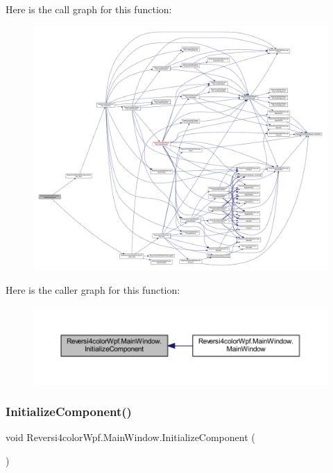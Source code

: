 Here is the call graph for this function\+:
\nopagebreak
\begin{figure}[H]
\begin{center}
\leavevmode
\includegraphics[width=350pt]{class_reversi4color_wpf_1_1_main_window_a20f84946e71f327820f3ccbefca1f3a0_cgraph}
\end{center}
\end{figure}
Here is the caller graph for this function\+:
\nopagebreak
\begin{figure}[H]
\begin{center}
\leavevmode
\includegraphics[width=350pt]{class_reversi4color_wpf_1_1_main_window_a20f84946e71f327820f3ccbefca1f3a0_icgraph}
\end{center}
\end{figure}
\mbox{\label{class_reversi4color_wpf_1_1_main_window_a20f84946e71f327820f3ccbefca1f3a0}} 
\subsubsection{\texorpdfstring{Initialize\+Component()}{InitializeComponent()}\hspace{0.1cm}{\footnotesize\ttfamily [4/4]}}
{\footnotesize\ttfamily void Reversi4color\+Wpf.\+Main\+Window.\+Initialize\+Component (\begin{DoxyParamCaption}{ }\end{DoxyParamCaption})}



